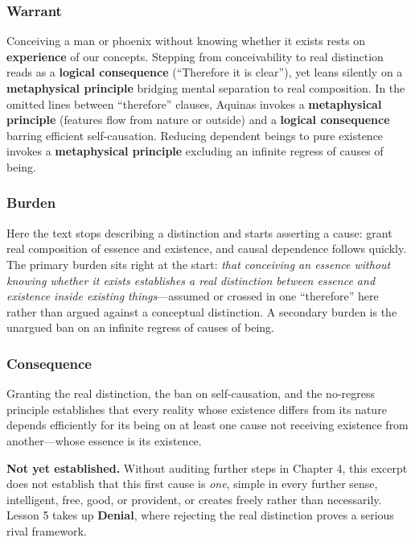 \subsubsection*{Warrant}

Conceiving a man or phoenix without knowing whether it exists rests on \textbf{experience} of our concepts. Stepping from conceivability to real distinction reads as a \textbf{logical consequence} (``Therefore it is clear''), yet leans silently on a \textbf{metaphysical principle} bridging mental separation to real composition. In the omitted lines between ``therefore'' clauses, Aquinas invokes a \textbf{metaphysical principle} (features flow from nature or outside) and a \textbf{logical consequence} barring efficient self-causation. Reducing dependent beings to pure existence invokes a \textbf{metaphysical principle} excluding an infinite regress of causes of being.

\subsubsection*{Burden}

Here the text stops describing a distinction and starts asserting a cause: grant real composition of essence and existence, and causal dependence follows quickly. The primary burden sits right at the start: \emph{that conceiving an essence without knowing whether it exists establishes a real distinction between essence and existence inside existing things}---assumed or crossed in one ``therefore'' here rather than argued against a conceptual distinction. A secondary burden is the unargued ban on an infinite regress of causes of being.

\subsubsection*{Consequence}

Granting the real distinction, the ban on self-causation, and the no-regress principle establishes that every reality whose existence differs from its nature depends efficiently for its being on at least one cause not receiving existence from another---whose essence is its existence.

\textbf{Not yet established.} Without auditing further steps in Chapter 4, this excerpt does not establish that this first cause is \emph{one}, simple in every further sense, intelligent, free, good, or provident, or creates freely rather than necessarily. Lesson 5 takes up \textbf{Denial}, where rejecting the real distinction proves a serious rival framework.

